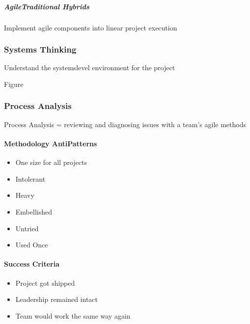 \documentclass[letterpaper,10pt,english]{jupyterBook}
\begin{document}
\subparagraph{Agile\sphinxhyphen{}Traditional Hybrids}
\label{\detokenize{APM/agile:agile-traditional-hybrids}}
\sphinxAtStartPar
Implement agile components into linear project execution


\subsubsection{Systems Thinking}
\label{\detokenize{APM/agile:systems-thinking}}
\sphinxAtStartPar
Understand the systems\sphinxhyphen{}level environment for the project

\sphinxAtStartPar
Figure


\subsubsection{Process Analysis}
\label{\detokenize{APM/agile:process-analysis}}
\sphinxAtStartPar
Process Analysis = reviewing and diagnosing issues with a team’s agile methods


\paragraph{Methodology Anti\sphinxhyphen{}Patterns}
\label{\detokenize{APM/agile:methodology-anti-patterns}}\begin{itemize}
\item {} 
\sphinxAtStartPar
One size for all projects

\item {} 
\sphinxAtStartPar
Intolerant

\item {} 
\sphinxAtStartPar
Heavy

\item {} 
\sphinxAtStartPar
Embellished

\item {} 
\sphinxAtStartPar
Untried

\item {} 
\sphinxAtStartPar
Used Once

\end{itemize}


\paragraph{Success Criteria}
\label{\detokenize{APM/agile:success-criteria}}\begin{itemize}
\item {} 
\sphinxAtStartPar
Project got shipped

\item {} 
\sphinxAtStartPar
Leadership remained intact

\item {} 
\sphinxAtStartPar
Team would work the same way again

\end{itemize}
\end{document}
